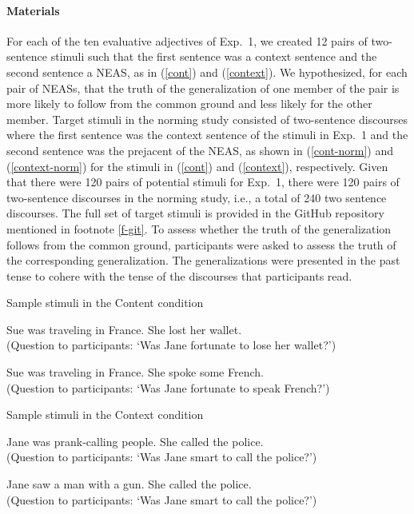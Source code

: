 \documentclass[11pt,fleqn]{article}
\newcommand{\6}{\mbox{$[\hspace*{-.6mm}[$}}
\newcommand{\9}{\mbox{$]\hspace*{-.6mm}]$}}
\begin{document}
\paragraph{Materials} For each of the ten evaluative adjectives of Exp.~1, we created 12 pairs of two-sentence stimuli such that the first sentence was a context sentence and the second sentence a NEAS, as in (\ref{cont}) and (\ref{context}). We hypothesized, for each pair of NEASs, that the truth of the generalization of one member of the pair is more likely to follow from the common ground and less likely for the other member. Target stimuli in the norming study consisted of two-sentence discourses where the first sentence was the context sentence of the stimuli in Exp.~1 and the second sentence was the prejacent of the NEAS, as shown in (\ref{cont-norm}) and (\ref{context-norm}) for the stimuli in (\ref{cont}) and (\ref{context}), respectively. Given that there were 120 pairs of potential stimuli for Exp.~1, there were 120 pairs of two-sentence discourses in the norming study, i.e., a total of 240 two sentence discourses. The full set of target stimuli is provided in the GitHub repository mentioned in footnote \ref{f-git}. To assess whether the truth of the generalization  follows from the common ground, participants were asked to assess the truth of the corresponding generalization. The generalizations were presented in the past tense to cohere with the tense of the discourses that participants read.


\begin{exe}
\ex\label{cont-norm} Sample stimuli in the Content condition 

\begin{xlist}
\ex Sue was traveling in France. She lost her wallet. \\ (Question to  participants: `Was Jane fortunate to lose her wallet?')

\ex Sue was traveling in France. She spoke some French. \\ (Question to participants: `Was Jane fortunate to speak French?')

\end{xlist}

\ex\label{context-norm} Sample stimuli in the Context condition

\begin{xlist}
\ex Jane was prank-calling people. She called the police. \\ (Question to participants: `Was Jane smart to call the police?')

\ex Jane saw a man with a gun. She called the police. \\ (Question to participants: `Was Jane smart to call the police?')
\end{xlist}
\end{exe}
\end{document}
